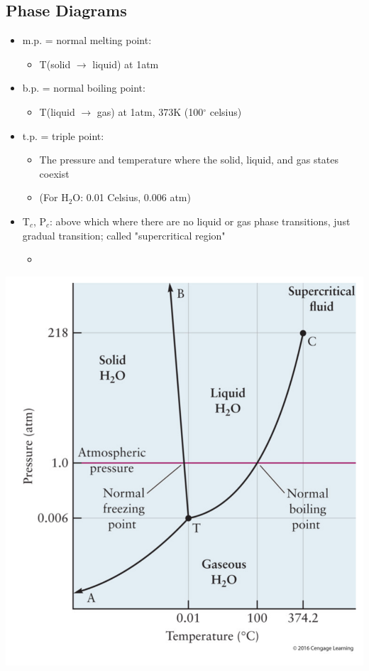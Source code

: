 \documentclass[10pt]{article}
\begin{document}
\subsection*{Phase Diagrams}
\begin{itemize}
    \item m.p. = normal melting point:
        \begin{itemize}
            \item T(solid $\rightarrow$ liquid) at 1atm
        \end{itemize}    
    \item b.p. = normal boiling point:
        \begin{itemize}
            \item T(liquid $\rightarrow$ gas) at 1atm, 373K (100$^\circ$ celsius)
        \end{itemize}
    \item t.p. = triple point:
        \begin{itemize}
            \item The pressure and temperature where the solid, liquid, and gas states coexist
            \item (For H$_2$O: 0.01 Celsius, 0.006 atm)
        \end{itemize}
    \item T$_c$, P$_c$: above which where there are no liquid or gas phase transitions, just gradual transition; called "supercritical region"
        \begin{itemize}
            \item 
        \end{itemize}
\end{itemize}

\begin{center}
    \includegraphics*[scale=0.5]{W3_3}
\end{center}
\end{document}
